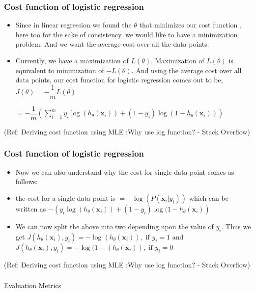\begin{frame}[fragile]\frametitle{Cost function of logistic regression}
\begin{itemize}
\item Since in linear regression we found the $\theta$ that minimizes our cost function , here too for the sake of consistency, we would like to have a minimization problem. And we want the average cost over all the data points. 
\item Currently, we have a maximization of $L(\theta)$. Maximization of $L(\theta)$ is equivalent to minimization of $-L(\theta)$. And using the average cost over all data points, our cost function for logistic regression comes out to be, $J(\theta) = - \dfrac{1}{m} L(\theta)$

$= - \dfrac{1}{m} \left(  \sum_{i=1}^{m} y_i \log (h_{\theta}(\mathbf{x}_i)) +  (1-y_i) \log (1 - h_{\theta}(\mathbf{x}_i)) \right )$
\end{itemize}

{\tiny (Ref: Deriving cost function using MLE :Why use log function? - Stack Overflow)}
\end{frame}

\begin{frame}[fragile]\frametitle{Cost function of logistic regression}
\begin{itemize}
\item Now we can also understand why the cost for single data point comes as follows:
\item the cost for a single data point is $=  -\log( P(\mathbf{x}_i | y_i))$ which can be written as $- \left ( y_i \log (h_{\theta}(\mathbf{x}_i)) + (1 - y_i) \log (1 - h_{\theta}(\mathbf{x}_i) \right )$
\item We can now split the above into two depending upon the value of $y_i$. Thus we get $J(h_{\theta}(\mathbf{x}_i), y_i) = - \log (h_{\theta}(\mathbf{x}_i))  , \text{     if } y_i=1$ and
$ J(h_{\theta}(\mathbf{x}_i), y_i) = - \log (1 -  (h_{\theta}(\mathbf{x}_i) )  , \text{    if } y_i=0$
\end{itemize}

{\tiny (Ref: Deriving cost function using MLE :Why use log function? - Stack Overflow)}
\end{frame}



\begin{frame}[fragile]\frametitle{}
\begin{center}
{\Large Evaluation Metrics}
\end{center}
\end{frame}


